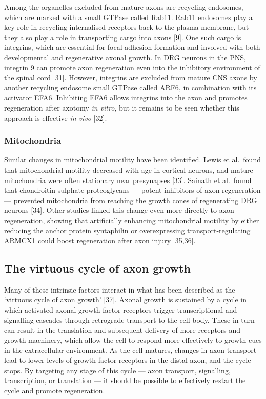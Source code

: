 \documentclass[
  12pt,
  a4paper,
]{book}
\begin{document}
Among the organelles excluded from mature axons are recycling endosomes, which are marked with a small GTPase called Rab11. Rab11 endosomes play a key role in recycling internalised receptors back to the plasma membrane, but they also play a role in transporting cargo into axons {[}9{]}. One such cargo is integrins, which are essential for focal adhesion formation and involved with both developmental and regenerative axonal growth. In DRG neurons in the PNS, integrin \textalpha{}9 can promote axon regeneration even into the inhibitory environment of the spinal cord {[}31{]}. However, integrins are excluded from mature CNS axons by another recycling endosome small GTPase called ARF6, in combination with its activator EFA6. Inhibiting EFA6 allows integrins into the axon and promotes regeneration after axotomy \emph{in vitro}, but it remains to be seen whether this approach is effective \emph{in vivo} {[}32{]}.

\hypertarget{mitochondria}{%
\subsubsection{Mitochondria}\label{mitochondria}}

Similar changes in mitochondrial motility have been identified. Lewis et al.~found that mitochondrial motility decreased with age in cortical neurons, and mature mitochondria were often stationary near presynapses {[}33{]}. Sainath et al.~found that chondroitin sulphate proteoglycans --- potent inhibitors of axon regeneration --- prevented mitochondria from reaching the growth cones of regenerating DRG neurons {[}34{]}. Other studies linked this change even more directly to axon regeneration, showing that artificially enhancing mitochondrial motility by either reducing the anchor protein syntaphilin or overexpressing transport-regulating ARMCX1 could boost regeneration after axon injury {[}35,36{]}.

\hypertarget{the-virtuous-cycle-of-axon-growth}{%
\subsection{The virtuous cycle of axon growth}\label{the-virtuous-cycle-of-axon-growth}}

Many of these intrinsic factors interact in what has been described as the `virtuous cycle of axon growth' {[}37{]}. Axonal growth is sustained by a cycle in which activated axonal growth factor receptors trigger transcriptional and signalling cascades through retrograde transport to the cell body. These in turn can result in the translation and subsequent delivery of more receptors and growth machinery, which allow the cell to respond more effectively to growth cues in the extracellular environment. As the cell matures, changes in axon transport lead to lower levels of growth factor receptors in the distal axon, and the cycle stops. By targeting any stage of this cycle --- axon transport, signalling, transcription, or translation --- it should be possible to effectively restart the cycle and promote regeneration.
\end{document}
